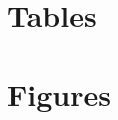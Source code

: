 \newpage
\pagebreak

\section{Tables} %
\label{sec:tabs-ap}


\newpage
\pagebreak



\newpage
\pagebreak



\newpage
\pagebreak



\newpage
\pagebreak

\section{Figures}\label{appendix:figs}

